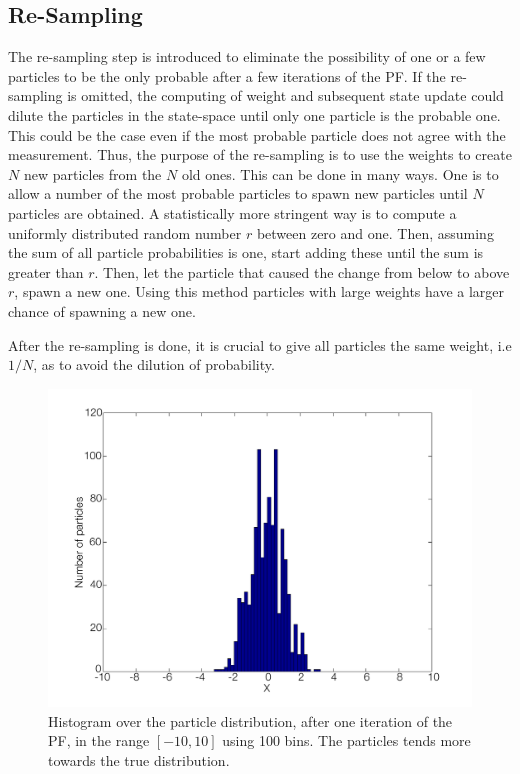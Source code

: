 \documentclass{LTHthesis}
\begin{document}
\subsection{Re-Sampling}
%
The re-sampling step is introduced to eliminate the possibility of one or a few particles to be the only probable after a few iterations of the PF. If the re-sampling is omitted, the computing of weight and subsequent state update could dilute the particles in the state-space until only one particle is the probable one. This could be the case even if the most probable particle does not agree with the measurement. Thus, the purpose of the re-sampling is to use the weights to create $N$ new particles from the $N$ old ones. This can be done in many ways. One is to allow a number of the most probable particles to spawn new particles until $N$ particles are obtained. A statistically more stringent way is to compute a uniformly distributed random number $r$ between zero and one. Then, assuming the sum of all particle probabilities is one, start adding these until the sum is greater than $r$. Then, let the particle that caused the change from below to above $r$, spawn a new one. Using this method particles with large weights have a larger chance of spawning a new one.

After the re-sampling is done, it is crucial to give all particles the same weight, i.e $1/N$, as to avoid the dilution of probability.
%
\begin{figure}[!hbt]

\includegraphics[width=1\textwidth ]{images/PF/hist_dist_1_itr}
\caption{Histogram over the particle distribution, after one iteration of the PF, in the range $[-10,10]$ using 100 bins. The particles tends more towards the true distribution.}\label{hist_dist_1_itr}
\end{figure}
\end{document}
